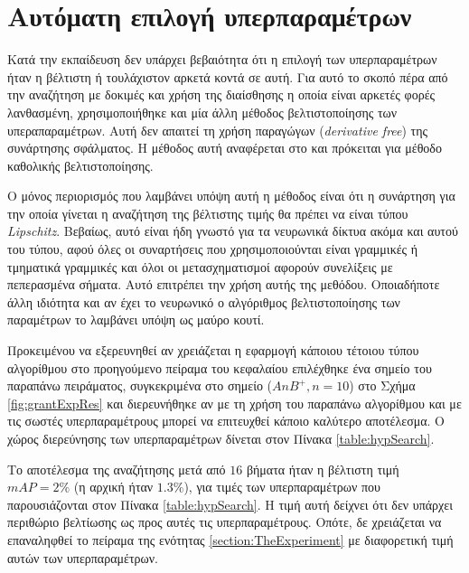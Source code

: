 \section{Αυτόματη επιλογή υπερπαραμέτρων}
\label{section:autohyperparamters}
Κατά την εκπαίδευση δεν υπάρχει βεβαιότητα ότι η επιλογή των υπερπαραμέτρων ήταν η βέλτιστη ή τουλάχιστον αρκετά κοντά σε αυτή. Για αυτό το σκοπό πέρα από την αναζήτηση με δοκιμές  και χρήση της διαίσθησης η οποία είναι αρκετές φορές λανθασμένη, χρησιμοποιήθηκε και μία άλλη μέθοδος βελτιστοποίησης των υπεραπαραμέτρων. Αυτή δεν απαιτεί τη χρήση παραγώγων (\textit{derivative free}) της συνάρτησης σφάλματος. Η μέθοδος αυτή αναφέρεται στο \cite{64} και πρόκειται για μέθοδο καθολικής βελτιστοποίησης.

Ο μόνος περιορισμός που λαμβάνει υπόψη αυτή η μέθοδος είναι ότι η συνάρτηση για την οποία γίνεται η αναζήτηση της βέλτιστης τιμής θα πρέπει να είναι τύπου \textit{Lipschitz}. Βεβαίως, αυτό είναι ήδη γνωστό για τα νευρωνικά δίκτυα ακόμα και αυτού του τύπου, αφού όλες οι συναρτήσεις που χρησιμοποιούνται είναι γραμμικές ή τμηματικά γραμμικές και όλοι οι μετασχηματισμοί αφορούν συνελίξεις με πεπερασμένα σήματα. Αυτό επιτρέπει την χρήση αυτής της μεθόδου. Οποιαδήποτε άλλη ιδιότητα και αν έχει το νευρωνικό ο αλγόριθμος βελτιστοποίησης των παραμέτρων το λαμβάνει υπόψη ως μαύρο κουτί.

Προκειμένου να εξερευνηθεί αν χρειάζεται η εφαρμογή κάποιου τέτοιου τύπου αλγορίθμου στο προηγούμενο πείραμα του κεφαλαίου επιλέχθηκε ένα σημείο του παραπάνω πειράματος, συγκεκριμένα στο σημείο ($AnB^+, n=10$) στο Σχήμα \ref{fig:grantExpRes} και διερευνήθηκε αν με τη χρήση του παραπάνω αλγορίθμου και με τις σωστές υπερπαραμέτρους μπορεί να επιτευχθεί κάποιο καλύτερο αποτέλεσμα. O χώρος διερεύνησης των υπερπαραμέτρων δίνεται στον Πίνακα \ref{table:hypSearch}.

Το αποτέλεσμα της αναζήτησης μετά από $16$ βήματα ήταν η βέλτιστη τιμή $mAP=2\%$ (η αρχική ήταν $1.3\%$), για τιμές των υπερπαραμέτρων που παρουσιάζονται στον Πίνακα \ref{table:hypSearch}. Η τιμή αυτή δείχνει ότι δεν υπάρχει περιθώριο βελτίωσης ως προς αυτές τις υπερπαραμέτρους. Οπότε, δε χρειάζεται να επαναληφθεί το πείραμα της ενότητας \ref{section:TheExperiment} με διαφορετική τιμή αυτών των υπερπαραμέτρων.

